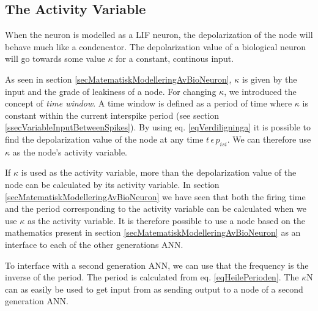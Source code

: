  		\subsection{The Activity Variable} %
	When the neuron is modelled as a LIF neuron, the depolarization of the node will behave much like a condencator. 
	The depolarization value of a biological neuron will go towards some value $\kappa$ for a constant, continous input.

	As seen in section \ref{secMatematiskModelleringAvBioNeuron}, $\kappa$ is given by the input and the grade of leakiness of a node.
	For changing $\kappa$, we introduced the concept of \emph{time window}. 
	A time window is defined as a period of time where $\kappa$ is constant within the current interspike period (see section \ref{ssecVariableInputBetweenSpikes}).
	By using eq. \eqref{eqVerdiligninga} it is possible to find the depolarization value of the node at any time $t \, \epsilon \, p_{isi}$.
	We can therefore use $\kappa$ as the node's activity variable.

	If $\kappa$ is used as the activity variable, more than the depolarization value of the node can be calculated by its activity variable. 
	In section \ref{secMatematiskModelleringAvBioNeuron} we have seen that both the firing time and the period corresponding to the activity variable can be calculated when we use $\kappa$ as the activity variable.
	It is therefore possible to use a node based on the mathematics present in section \ref{secMatematiskModelleringAvBioNeuron} as an interface to each of the other generations ANN.

	To interface with a second generation ANN, we can use that the frequency is the inverse of the period. The period is calculated from eq. \eqref{eqHeilePerioden}.
	The $\kappa$N can as easily be used to get input from as sending output to a node of a second generation ANN. %

